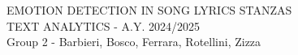 \documentclass[12pt,openany]{report}
\begin{document}
\justify

\setcounter{page}{1}

EMOTION DETECTION IN SONG LYRICS STANZAS\\
TEXT ANALYTICS - A.Y. 2024/2025\\
Group 2 - Barbieri, Bosco, Ferrara, Rotellini, Zizza







% 
% 




% 


% 






\clearpage

% 
% 
% 
\printbibliography
\renewcommand{\listfigurename}{List of figures}
\listoffigures

\end{document}
